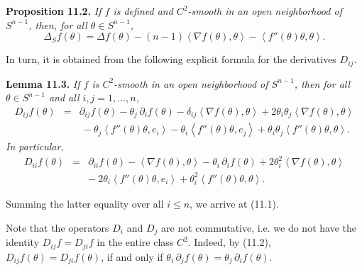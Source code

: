 \documentclass[reqno,12pt]{amsart}
\theoremstyle{plain}
\begin{document}
\vskip5mm
{\bf Proposition 11.2.} {\it If $f$ is defined and $C^2$-smooth in 
an open neighborhood of $S^{n-1}$, then, for all $\theta \in S^{n-1}$,
\begin{equation}
\Delta_S f(\theta) =
\Delta f(\theta) - (n-1) \left<\nabla f(\theta),\theta\right> 
- \left<f''(\theta)\theta,\theta\right>.
\end{equation}
}

\vskip2mm
In turn, it is obtained from the following explicit formula for the
derivatives $D_{ij}$. 

\vskip5mm
{\bf Lemma 11.3.} {\it If $f$ is $C^2$-smooth in 
an open neighborhood of $S^{n-1}$, then for all $\theta \in S^{n-1}$
and all $i,j=1,\dots,n$,
\begin{eqnarray}
D_{ij} f(\theta)
 & = &
\partial_{ij} f(\theta) - \theta_j\, \partial_i f(\theta) 
- \delta_{ij} \left<\nabla f(\theta),\theta\right> 
+ 2 \theta_i \theta_j \left<\nabla f(\theta),\theta\right> \nonumber \\
 & & \
- \theta_j \left<f''(\theta)\theta,e_i\right> - 
\theta_i \left<f''(\theta)\theta,e_j\right>
+ \theta_i \theta_j \left<f''(\theta)\theta,\theta\right>.
\end{eqnarray}
In particular,
\begin{eqnarray*}
D_{ii} f(\theta)
 & = &
\partial_{ii} f(\theta) - \left<\nabla f(\theta),\theta\right> -
\theta_i\, \partial_i f(\theta) 
+ 2 \theta_i^2 \left<\nabla f(\theta),\theta\right> \\
 & &
- \ 2\theta_i \left<f''(\theta)\theta,e_i\right> 
+ \theta_i^2 \left<f''(\theta)\theta,\theta\right>.
\end{eqnarray*}
}

\vskip2mm
Summing the latter equality over all $i \leq n$, we arrive at (11.1).

Note that the operators $D_i$ and $D_j$ are not commutative, i.e. 
we do not have the identity $D_{ij} f = D_{ji} f$ in the entire
class $C^2$. Indeed, by (11.2),
$D_{ij} f(\theta) = D_{ji} f(\theta)$, if and only if
$\theta_i\, \partial_j f(\theta) = \theta_j\, \partial_i f(\theta)$.
\end{document}
